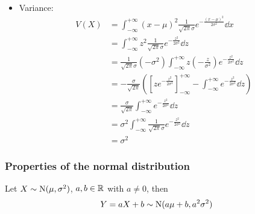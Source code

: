 \documentclass[14pt]{extarticle}
\newcommand{\Normal}{{\operatorfont N}}
\begin{document}
\begin{itemize}
    \item Variance:
          \begin{align}
              V(X) & = \int_{-\infty}^{+\infty} (x - \mu)^2 \frac{1}{\sqrt{2\pi} \sigma} e^{-\frac{(x-\mu)^2}{2\sigma^2}} \dd{x}                                                               \\
                   & = \int_{-\infty}^{+\infty} z^2 \frac{1}{\sqrt{2\pi} \sigma} e^{-\frac{z^2}{2\sigma^2}} \dd{z}                                                                             \\
                   & = \frac{1}{\sqrt{2\pi} \sigma}(-\sigma^2) \int_{-\infty}^{+\infty} z \left(- \frac{z}{\sigma^2}\right) e^{-\frac{z^2}{2\sigma^2}} \dd{z}                                  \\
                   & = -\frac{\sigma}{\sqrt{2\pi}} \left( \left[ z e^{-\frac{z^2}{2\sigma^2}} \right]_{-\infty}^{+\infty} - \int_{-\infty}^{+\infty} e^{-\frac{z^2}{2\sigma^2}} \dd{z} \right) \\
                   & = \frac{\sigma}{\sqrt{2\pi}} \int_{-\infty}^{+\infty} e^{-\frac{z^2}{2\sigma^2}} \dd{z}                                                                                   \\
                   & = \sigma^2 \int_{-\infty}^{+\infty} \frac{1}{\sqrt{2\pi} \sigma} e^{-\frac{z^2}{2\sigma^2}} \dd{z}                                                                        \\
                   & = \sigma^2
          \end{align}
\end{itemize}

\subsubsection{Properties of the normal distribution}


\begin{theorem}
    Let $X \sim \Normal(\mu, \sigma^2)$, $a, b \in \mathbb{R}$ with $a \neq 0$, then
    \begin{equation}
        Y = aX + b \sim \Normal(a\mu + b, a^2 \sigma^2)
    \end{equation}
\end{theorem}
\end{document}
